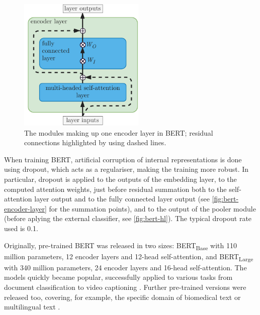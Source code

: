 \documentclass[bsc,frontabs,twoside,singlespacing,parskip,deptreport]{infthesis}
\begin{document}
{{{      \begin{figure}[h!t]
        \centering
        \includegraphics[width=6cm]{graphics/bert-encoder-layer}
        \caption{The modules making up one encoder layer in BERT; residual connections highlighted by using dashed lines.}
        \label{fig:bert-encoder-layer}
      \end{figure}

      When training BERT, artificial corruption of internal representations is done using dropout, which acts as a regulariser, making the training more robust. In particular, dropout is applied to the outputs of the embedding layer, to the computed attention weights, just before residual summation both to the self-attention layer output and to the fully connected layer output (see \autoref{fig:bert-encoder-layer} for the summation points), and to the output of the pooler module (before aplying the external classifier, see \autoref{fig:bert-hl}). The typical dropout rate used is 0.1.
      
      Originally, pre-trained BERT was released in two sizes: BERT\textsubscript{Base} with 110 million parameters, 12 encoder layers and 12-head self-attention, and BERT\textsubscript{Large} with 340 million parameters, 24 encoder layers and 16-head self-attention. The models quickly became popular, successfully applied to various tasks from document classification \citep{Adhikari_2019} to video captioning \citep{Sun_2019}. Further pre-trained versions were released too, covering, for example, the specific domain of biomedical text \citep{Lee_2019} or multilingual text \citep{Pires_2019}.
    }

}}
\end{document}
